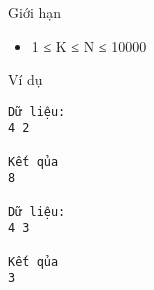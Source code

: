 Giới hạn
\begin{itemize}
	\item     1 ≤ K ≤  N ≤ 10000   
\end{itemize}
Ví dụ
\begin{verbatim}
Dữ liệu:
4 2

Kết qủa
8

Dữ liệu:
4 3

Kết qủa
3
\end{verbatim}